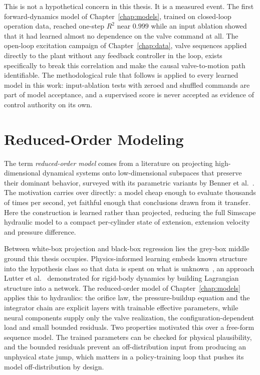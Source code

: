 This is not a hypothetical concern in this thesis. It is a measured
event. The first forward-dynamics model of Chapter~\ref{chap:models},
trained on closed-loop operation data, reached one-step $R^2$ near
$0.999$ while an input ablation showed that it had learned almost no
dependence on the valve command at all. The open-loop excitation
campaign of Chapter~\ref{chap:data}, valve sequences applied directly
to the plant without any feedback controller in the loop, exists
specifically to break this correlation and make the causal
valve-to-motion path identifiable. The methodological rule that follows is applied to every
learned model in this work: input-ablation tests with zeroed and
shuffled commands are part of model acceptance, and a supervised score
is never accepted as evidence of control authority on its own.

\section{Reduced-Order Modeling}
\label{sec:fund:rom}

The term \emph{reduced-order model} comes from a literature on projecting
high-dimensional dynamical systems onto low-dimensional subspaces that
preserve their dominant behavior, surveyed with its parametric variants by
Benner et al.~\cite{benner2015survey}. The motivation carries over directly:
a model cheap enough to evaluate thousands of times per second, yet faithful
enough that conclusions drawn from it transfer. Here the construction is
learned rather than projected, reducing the full Simscape hydraulic model to
a compact per-cylinder state of extension, extension velocity and pressure
difference.

Between white-box projection and black-box regression lies the grey-box
middle ground this thesis occupies. Physics-informed learning embeds known
structure into the hypothesis class so that data is spent on what is
unknown~\cite{karniadakis2021physics}, an approach Lutter et
al.~\cite{lutter2019deep} demonstrated for rigid-body dynamics by building
Lagrangian structure into a network. The reduced-order model of
Chapter~\ref{chap:models} applies this to hydraulics: the orifice law, the
pressure-buildup equation and the integrator chain are explicit layers with
trainable effective parameters, while neural components supply only the valve
realization, the configuration-dependent load and small bounded residuals.
Two properties motivated this over a free-form sequence model. The trained
parameters can be checked for physical plausibility, and the bounded
residuals prevent an off-distribution input from producing an unphysical
state jump, which matters in a policy-training loop that pushes its model
off-distribution by design.

